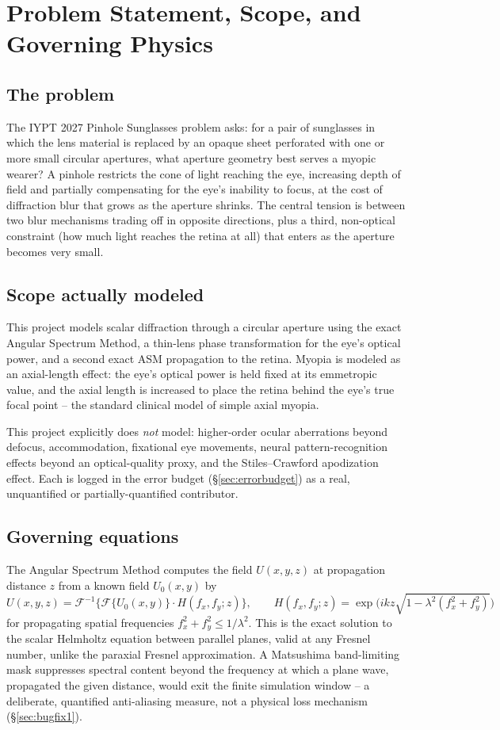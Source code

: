 \documentclass[11pt]{report}
\begin{document}
\chapter{Problem Statement, Scope, and Governing Physics}

\section{The problem}
The IYPT 2027 Pinhole Sunglasses problem asks: for a pair of sunglasses in which the lens material is replaced by an opaque sheet perforated with one or more small circular apertures, what aperture geometry best serves a myopic wearer? A pinhole restricts the cone of light reaching the eye, increasing depth of field and partially compensating for the eye's inability to focus, at the cost of diffraction blur that grows as the aperture shrinks. The central tension is between two blur mechanisms trading off in opposite directions, plus a third, non-optical constraint (how much light reaches the retina at all) that enters as the aperture becomes very small.

\section{Scope actually modeled}
This project models scalar diffraction through a circular aperture using the exact Angular Spectrum Method, a thin-lens phase transformation for the eye's optical power, and a second exact ASM propagation to the retina. Myopia is modeled as an axial-length effect: the eye's optical power is held fixed at its emmetropic value, and the axial length is increased to place the retina behind the eye's true focal point -- the standard clinical model of simple axial myopia.

This project explicitly does \emph{not} model: higher-order ocular aberrations beyond defocus, accommodation, fixational eye movements, neural pattern-recognition effects beyond an optical-quality proxy, and the Stiles--Crawford apodization effect. Each is logged in the error budget (\S\ref{sec:errorbudget}) as a real, unquantified or partially-quantified contributor.

\section{Governing equations}
The Angular Spectrum Method computes the field $U(x,y,z)$ at propagation distance $z$ from a known field $U_0(x,y)$ by
\begin{equation}
U(x,y,z) = \mathcal{F}^{-1}\Big\{\mathcal{F}\{U_0(x,y)\}\cdot H(f_x,f_y;z)\Big\}, \qquad
H(f_x,f_y;z) = \exp\!\Big(ikz\sqrt{1-\lambda^2(f_x^2+f_y^2)}\Big)
\label{eq:asm}
\end{equation}
for propagating spatial frequencies $f_x^2+f_y^2 \le 1/\lambda^2$. This is the exact solution to the scalar Helmholtz equation between parallel planes, valid at any Fresnel number, unlike the paraxial Fresnel approximation. A Matsushima band-limiting mask suppresses spectral content beyond the frequency at which a plane wave, propagated the given distance, would exit the finite simulation window -- a deliberate, quantified anti-aliasing measure, not a physical loss mechanism (\S\ref{sec:bugfix1}).
\end{document}
